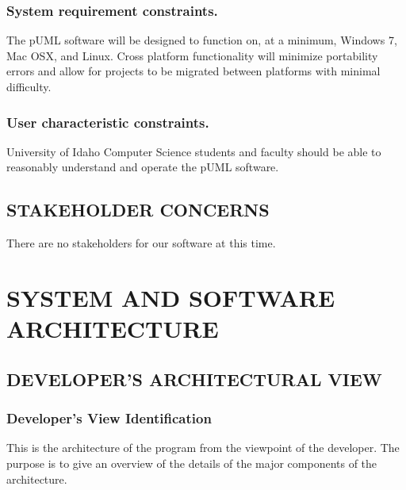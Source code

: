 \documentclass[twoside,letterpaper]{article}
\begin{document}
{\subsubsection{System requirement constraints.}
{\color{black}
The pUML software will be designed to function on, at a minimum, Windows 7, Mac OSX, and Linux.  Cross platform functionality will minimize portability errors and allow for projects to be migrated between platforms with minimal difficulty.
}

\subsubsection{User characteristic constraints.}
{\color{black}
University of Idaho Computer Science students and faculty should be able
to reasonably understand and operate the pUML software.
}

\subsection[STAKEHOLDER
CONCERNS]{\bfseries\color{black} STAKEHOLDER
CONCERNS}
{\color{black}
There are no stakeholders for our software at this time.
}


\bigskip





\clearpage\setcounter{page}{1}\pagestyle{Convertvi}
\section[SYSTEM AND SOFTWARE
ARCHITECTURE]{\bfseries\color{black} SYSTEM AND
SOFTWARE ARCHITECTURE}

\subsection[DEVELOPER{\textquoteright}S ARCHITECTURAL
VIEW]{\bfseries\color{black}
DEVELOPER{\textquoteright}S ARCHITECTURAL VIEW}

\subsubsection[Developer{\textquoteright}s View
Identification]{\bfseries\color{black}
Developer{\textquoteright}s View Identification}
{\color{black}
This is the architecture of the program from the viewpoint of the
developer. The purpose is to give an overview of the details of the major
components of the architecture.}

}
\end{document}
